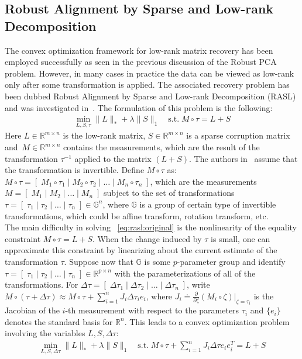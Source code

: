 \subsection{Robust Alignment by Sparse and Low-rank Decomposition}
\label{subsec: RASL}

The convex optimization framework for low-rank matrix recovery has been employed successfully as seen in the previous discussion of the Robust PCA problem. However, in many cases in practice the data can be viewed as low-rank only after some transformation is applied. The associated recovery problem has been dubbed Robust Alignment by Sparse and Low-rank Decomposition (RASL) and was investigated in~\cite{Peng:2010}. The formulation of this problem is the following:
%
\begin{align}
\min_{L, S, \tau}  \|L\|_{*} + \lambda\|S\|_{1} \quad  \text{s.t.} \;  M\circ\tau = L+S
\label{eq:rasl:original}
\end{align}
%
Here $L \in\mathbb{R}^{m\times n}$ is the low-rank matrix, $S\in\mathbb{R}^{m\times n}$ is a sparse corruption matrix and~$M\in\mathbb{R}^{m\times n}$ contains the measurements, which are the result of the transformation $\tau^{-1}$ applied to the matrix $(L+S)$. The authors in~\cite{Peng:2010} assume that the transformation is invertible. Define $M\circ\tau$ as: $M\circ\tau = [\;M_{1}\circ\tau_{1} \;|\;M_{2}\circ\tau_{2} \;|\; \dots \;|\; M_{n}\circ\tau_{n}\;]$, which are the measurements $M=[\;M_{1} \;|\;M_{2} \;|\; \dots \;|\; M_{n}\;]$ subject to the set of transformations $\tau=[\;\tau_{1} \;|\;\tau_{2} \;|\; \dots \;|\; \tau_{n}\;] \in\mathbb{G}^n$, where $\mathbb{G}$ is a group of certain type of invertible transformations, which could be affine transform, rotation transform, etc.  \\

The main difficulty in solving ~\eqref{eq:rasl:original} is the nonlinearity of the equality constraint $M\circ\tau = L+S$. When the change induced by $\tau$ is small, one can approximate this constraint by linearizing about the current estimate of the transformation $\tau$. Suppose now that $\mathbb{G}$ is some $p$-parameter group and identify $\tau=[\;\tau_{1} \;|\;\tau_{2} \;|\; \dots \;|\; \tau_{n}\;] \in \mathbb{R}^{p\times n}$ with the parameterizations of all of the transformations. For $\Delta\tau = [\;\Delta\tau_{1} \;|\; \Delta\tau_{2} \;|\; \dots \;|\; \Delta\tau_{n}\;]$, write $M\circ(\tau+\Delta\tau) \approx M\circ\tau + \sum_{i=1}^n J_{i}\Delta\tau_{i}e_{i}$, where $J_{i} \doteq \frac{\partial}{\partial\zeta}(M_{i}\circ\zeta)|_{\zeta = \tau_{i}}$ is the Jacobian of the $i$-th measurement with respect to the parameters $\tau_{i}$ and $\{e_{i}\}$ denotes the standard basis for $\mathbb{R}^n$. This leads to a convex optimization problem involving the variables $L, S, \Delta\tau$:
%
\begin{align}
\min_{L, S, \Delta\tau}  \|L\|_{*} + \lambda\|S\|_{1}  \quad \text{s.t.} \;  M\circ\tau + \sum_{i=1}^n J_{i}\Delta\tau e_{i}e_{i}^{T}= L+S
\label{eq:rasl:linearized}
\end{align}



